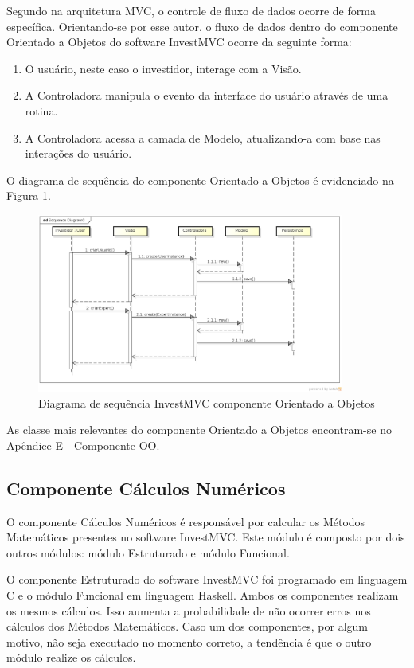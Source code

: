 Segundo  na arquitetura MVC, o controle de fluxo de dados ocorre de forma específica. Orientando-se por esse autor, o fluxo de dados dentro do componente Orientado a Objetos do software InvestMVC ocorre da seguinte forma:

\begin{enumerate}
\item O usuário, neste caso o investidor, interage com a Visão.
\item A Controladora manipula o evento da interface do usuário através de uma rotina.
\item A Controladora acessa a camada de Modelo, atualizando-a com base nas interações do usuário.
\end{enumerate}

O diagrama de sequência do componente Orientado a Objetos é evidenciado na Figura \ref{sequenciaOO}.

\begin{figure}[H]
\centering
\includegraphics[width=0.9\textwidth]{figuras/sequenciaOO}
\caption{Diagrama de sequência InvestMVC componente Orientado a Objetos}
\label{sequenciaOO}
\end{figure}

As classe mais relevantes do componente Orientado a Objetos encontram-se no Apêndice E - Componente OO.

\subsection{Componente Cálculos Numéricos}

O componente Cálculos Numéricos é responsável por calcular os Métodos Matemáticos presentes no software InvestMVC. Este módulo é composto por dois outros módulos: módulo Estruturado e módulo Funcional.

O componente Estruturado do software InvestMVC foi programado em linguagem C e o módulo Funcional em linguagem Haskell. Ambos os componentes realizam os mesmos cálculos. Isso aumenta a probabilidade de não ocorrer erros nos cálculos dos Métodos Matemáticos. Caso um dos componentes, por algum motivo, não seja executado no momento correto, a tendência é que o outro módulo realize os cálculos.

